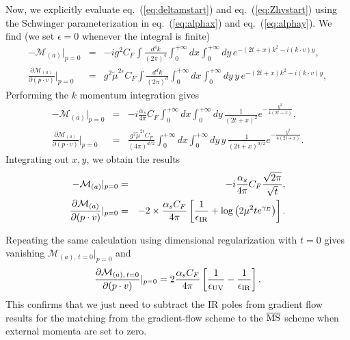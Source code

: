 Now, we explicitly evaluate eq.~(\ref{eq:deltamstart}) and eq.~(\ref{eq:Zhvstart}) using the Schwinger parameterization in eq.~(\ref{eq:alphax}) and eq.~(\ref{eq:alphay}). We find (we set $\epsilon=0$ whenever the integral is finite)
\begin{eqnarray}
\label{eq:deltamcalc0}
-\mathcal{M}_{(a)}|_{p=0} &=& -ig^2C_F\int\frac{d^4k}{(2\pi)^4}\int_0^{+\infty}dx\int_0^{+\infty}dy\, e^{-(2t+x)k^2- i(k\cdot v)y},\\
\label{eq:Zhvcalc0}
\frac{\partial\mathcal{M}_{(a)}}{\partial (p\cdot v)}|_{p=0} &=& g^2\tilde{\mu}^{2\epsilon}C_F\int\frac{d^dk}{(2\pi)^d}\int_0^{+\infty}dx\int_0^{+\infty}dy\, y\, e^{-(2t+x)k^2- i(k\cdot v)y},
\end{eqnarray}
Performing the $k$ momentum integration gives 
\begin{eqnarray}
\label{eq:deltamcalc1}
-\mathcal{M}_{(a)}|_{p=0} &=& -i\frac{\alpha_s}{4\pi}C_F\int_0^{+\infty}dx\int_0^{+\infty}dy\, \frac{1}{\left(2t +x\right)^2}e^{-\frac{y^2}{4\left(2t+x\right)}},\\
\label{eq:Zhvcal1}
\frac{\partial\mathcal{M}_{(a)}}{\partial (p\cdot v)}|_{p=0} &=& \frac{g^2\tilde{\mu}^{2\epsilon}C_F}{(4\pi)^{d/2}} \int_0^{+\infty}dx\int_0^{+\infty}dy\, y\, \frac{1}{\left(2t +x\right)^{d/2}}e^{-\frac{y^2}{4\left(2t+x\right)}}.
\end{eqnarray}
Integrating out $x, y$, we obtain the results 
\begin{eqnarray}
\label{eq:deltamresult0}
-\mathcal{M}_{(a)}|_{p=0}&=& -i\frac{\alpha_s}{4\pi}C_F\frac{\sqrt{2\pi}}{\sqrt{t}},\\
\label{eq:Zhvresult0}
\frac{\partial\mathcal{M}_{(a)}}{\partial (p\cdot v)}|_{p=0} &=& - 2\times\frac{\alpha_sC_F}{4\pi}\left[\frac{1}{\epsilon_{\rm IR}}+\log\left(2\mu^2 te^{\gamma_E}\right)\right].
\end{eqnarray} 

Repeating the same calculation using dimensional regularization with $t=0$ gives vanishing $\mathcal{M}_{(a),\, t=0}|_{p=0}$ and 
\begin{eqnarray}
\frac{\partial\mathcal{M}_{(a),\, t=0}}{\partial (p\cdot v)}|_{p=0}=
2\frac{\alpha_sC_F}{4\pi}\left[\frac{1}{\epsilon_{\rm UV}}-\frac{1}{\epsilon_{\rm IR}}\right].
\end{eqnarray}
This confirms that we just need to subtract the IR poles from gradient flow results for the matching from the gradient-flow scheme to the $\overline{\rm MS}$ scheme when external momenta are set to zero.


